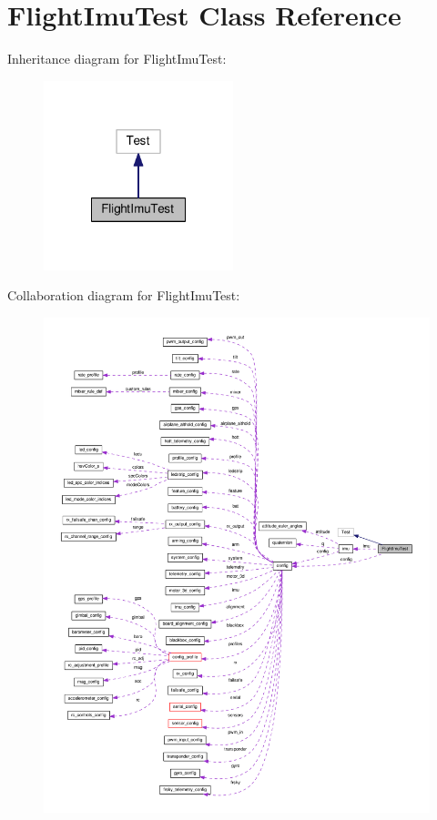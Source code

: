 \hypertarget{classFlightImuTest}{\section{Flight\+Imu\+Test Class Reference}
\label{classFlightImuTest}
}


Inheritance diagram for Flight\+Imu\+Test\+:\nopagebreak
\begin{figure}[H]
\begin{center}
\leavevmode
\includegraphics[width=156pt]{classFlightImuTest__inherit__graph}
\end{center}
\end{figure}


Collaboration diagram for Flight\+Imu\+Test\+:\nopagebreak
\begin{figure}[H]
\begin{center}
\leavevmode
\includegraphics[width=350pt]{classFlightImuTest__coll__graph}
\end{center}
\end{figure}
